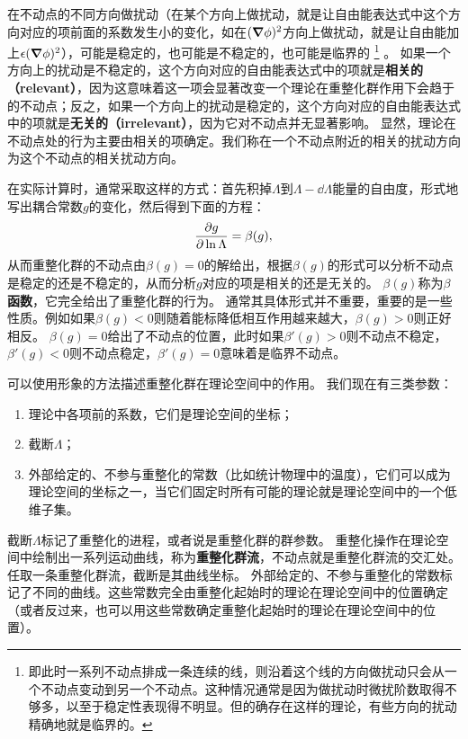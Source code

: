 \documentclass[hyperref, UTF8, a4paper]{ctexart}
\begin{document}
在不动点的不同方向做扰动（在某个方向上做扰动，就是让自由能表达式中这个方向对应的项前面的系数发生小的变化，如在$(\grad{\phi})^2$方向上做扰动，就是让自由能加上$\epsilon (\grad{\phi})^2$），可能是稳定的，也可能是不稳定的，也可能是临界的
\footnote{即此时一系列不动点排成一条连续的线，则沿着这个线的方向做扰动只会从一个不动点变动到另一个不动点。这种情况通常是因为做扰动时微扰阶数取得不够多，以至于稳定性表现得不明显。但的确存在这样的理论，有些方向的扰动精确地就是临界的。}%
。
如果一个方向上的扰动是不稳定的，这个方向对应的自由能表达式中的项就是\textbf{相关的（relevant）}，因为这意味着这一项会显著改变一个理论在重整化群作用下会趋于的不动点；反之，如果一个方向上的扰动是稳定的，这个方向对应的自由能表达式中的项就是\textbf{无关的（irrelevant）}，因为它对不动点并无显著影响。
显然，理论在不动点处的行为主要由相关的项确定。我们称在一个不动点附近的相关的扰动方向为这个不动点的相关扰动方向。

在实际计算时，通常采取这样的方式：首先积掉$\Lambda$到$\Lambda - \dd{\Lambda}$能量的自由度，形式地写出耦合常数$g$的变化，然后得到下面的方程：
\begin{equation}
    \pdv{g}{\ln \Lambda} = \beta(g),
\end{equation}
从而重整化群的不动点由$\beta(g)=0$的解给出，根据$\beta(g)$的形式可以分析不动点是稳定的还是不稳定的，从而分析$g$对应的项是相关的还是无关的。
$\beta(g)$称为\textbf{$\beta$函数}，它完全给出了重整化群的行为。
通常其具体形式并不重要，重要的是一些性质。例如如果$\beta(g) < 0$则随着能标降低相互作用越来越大，$\beta(g) > 0$则正好相反。
$\beta(g) = 0$给出了不动点的位置，此时如果$\beta'(g) > 0$则不动点不稳定，$\beta'(g) < 0$则不动点稳定，$\beta'(g) = 0$意味着是临界不动点。

可以使用形象的方法描述重整化群在理论空间中的作用。
我们现在有三类参数：
\begin{enumerate}
    \item 理论中各项前的系数，它们是理论空间的坐标；
    \item 截断$\Lambda$；
    \item 外部给定的、不参与重整化的常数（比如统计物理中的温度），它们可以成为理论空间的坐标之一，当它们固定时所有可能的理论就是理论空间中的一个低维子集。
\end{enumerate}
截断$\Lambda$标记了重整化的进程，或者说是重整化群的群参数。
重整化操作在理论空间中绘制出一系列运动曲线，称为\textbf{重整化群流}，不动点就是重整化群流的交汇处。
任取一条重整化群流，截断是其曲线坐标。
外部给定的、不参与重整化的常数标记了不同的曲线。这些常数完全由重整化起始时的理论在理论空间中的位置确定（或者反过来，也可以用这些常数确定重整化起始时的理论在理论空间中的位置）。
\end{document}
